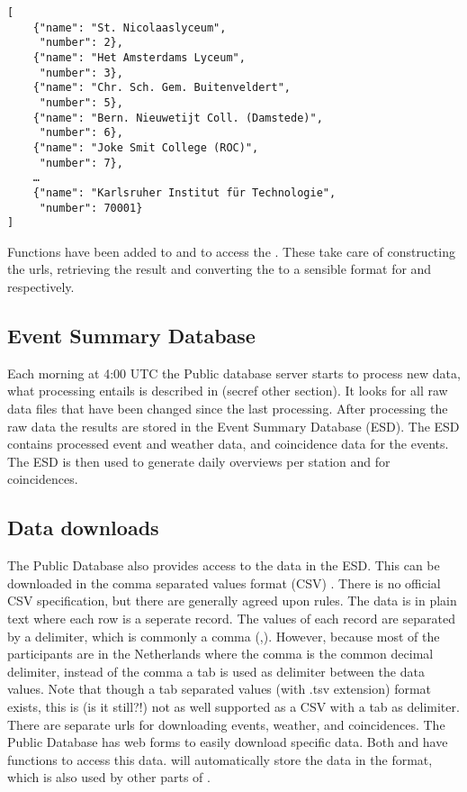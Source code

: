 \begin{verbatim}
[
    {"name": "St. Nicolaaslyceum",
     "number": 2},
    {"name": "Het Amsterdams Lyceum",
     "number": 3},
    {"name": "Chr. Sch. Gem. Buitenveldert",
     "number": 5},
    {"name": "Bern. Nieuwetijt Coll. (Damstede)",
     "number": 6},
    {"name": "Joke Smit College (ROC)",
     "number": 7},
    …
    {"name": "Karlsruher Institut für Technologie",
     "number": 70001}
]
\end{verbatim}

Functions have been added to \sapphire and \jsparc to access the \api. These take care of constructing the urls, retrieving the result and converting the \json to a sensible format for \python and \javascript respectively.


\subsection{Event Summary Database}

Each morning at 4:00 UTC the Public database server starts to process new data, what processing entails is described in (secref other section). It looks for all raw data files that have been changed since the last processing. After processing the raw data the results are stored in the Event Summary Database (ESD). The ESD contains processed event and weather data, and coincidence data for the events. The ESD is then used to generate daily overviews per station and for coincidences.


\subsection{Data downloads}

The Public Database also provides access to the data in the ESD. This can be downloaded in the comma separated values format (CSV) \cite{rfc4180}. There is no official CSV specification, but there are generally agreed upon rules. The data is in plain text where each row is a seperate record. The values of each record are separated by a delimiter, which is commonly a comma (,). However, because most of the \hisparc participants are in the Netherlands where the comma is the common decimal delimiter, instead of the comma a tab is used as delimiter between the data values. Note that though a tab separated values (with .tsv extension) format exists, this is (is it still?!) not as well supported as a CSV with a tab as delimiter. There are separate urls for downloading events, weather, and coincidences. The Public Database has web forms to easily download specific data. Both \sapphire and \jsparc have functions to access this data. \sapphire will automatically store the data in the \hdf format, which is also used by other parts of \sapphire.


